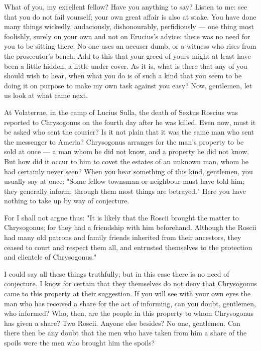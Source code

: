 What of you, my excellent fellow? Have you anything to say? Listen to me: see that you do not fail yourself; your own great affair is also at stake. You have done many things wickedly, audaciously, dishonourably, perfidiously --- one thing most foolishly, surely on your own and not on Erucius's advice: there was no need for you to be sitting there. No one uses an accuser dumb, or a witness who rises from the prosecutor's bench. Add to this that your greed of yours might at least have been a little hidden, a little under cover. As it is, what is there that any of you should wish to hear, when what you do is of such a kind that you seem to be doing it on purpose to make my own task against you easy? Now, gentlemen, let us look at what came next.

 At Volaterrae, in the camp of Lucius Sulla, the death of Sextus Roscius was reported to Chrysogonus on the fourth day after he was killed. Even now, must it be asked who sent the courier? Is it not plain that it was the same man who sent the messenger to Ameria? Chrysogonus arranges for the man's property to be sold at once --- a man whom he did not know, and a property he did not know. But how did it occur to him to covet the estates of an unknown man, whom he had certainly never seen? When you hear something of this kind, gentlemen, you usually say at once: "Some fellow townsman or neighbour must have told him; they generally inform; through them most things are betrayed." Here you have nothing to take up by way of conjecture.

 For I shall not argue thus: "It is likely that the Roscii brought the matter to Chrysogonus; for they had a friendship with him beforehand. Although the Roscii had many old patrons and family friends inherited from their ancestors, they ceased to court and respect them all, and entrusted themselves to the protection and clientele of Chrysogonus."

 I could say all these things truthfully; but in this case there is no need of conjecture. I know for certain that they themselves do not deny that Chrysogonus came to this property at their suggestion. If you will see with your own eyes the man who has received a share for the act of informing, can you doubt, gentlemen, who informed? Who, then, are the people in this property to whom Chrysogonus has given a share? Two Roscii. Anyone else besides? No one, gentlemen. Can there then be any doubt that the men who have taken from him a share of the spoils were the men who brought him the spoils?

